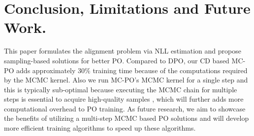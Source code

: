 



\vspace{-2mm}
\section{Conclusion, Limitations and Future Work.}
\vspace{-2mm}
This paper formulates the alignment problem via NLL estimation and propose sampling-based solutions for better PO. Compared to DPO, our CD based MC-PO adds approximately $30 \%$ training time because of the computations required by the MCMC kernel. Also we run MC-PO's MCMC kernel for a single step and this is typically sub-optimal because executing the MCMC chain for multiple steps is essential to acquire high-quality samples \citep{hinton2002training}, which will further adds more  computational overhead to PO training. As future research, we aim to showcase the benefits of utilizing a multi-step MCMC based PO solutions and will develop more efficient training algorithms to speed up these algorithms.

















